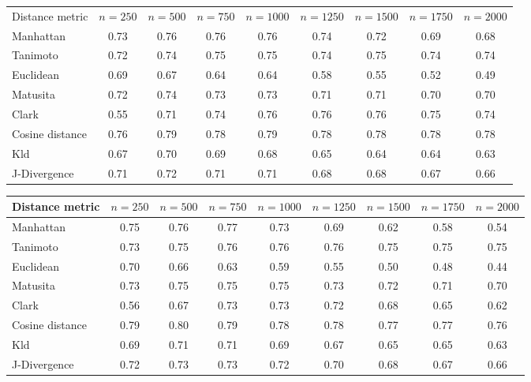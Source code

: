 \begin{table*}
  \centering
  \caption{Average precisions for $n$-MF Tokens and Lemmas on St-Jean}
  \label{tab:tokens_lemmas}

  \label{tab:tokens}
  \begin{tabular}{l c c c c c c c c}
    \toprule
    Distance metric &
    $n=250$ &
    $n=500$ &
    $n=750$ &
    $n=1000$ &
    $n=1250$ &
    $n=1500$ &
    $n=1750$ &
    $n=2000$ \\
    Manhattan       & 0.73 & 0.76 & 0.76 & 0.76 & 0.74 & 0.72 & 0.69 & 0.68 \\
    Tanimoto        & 0.72 & 0.74 & 0.75 & 0.75 & 0.74 & 0.75 & 0.74 & 0.74 \\
    Euclidean       & 0.69 & 0.67 & 0.64 & 0.64 & 0.58 & 0.55 & 0.52 & 0.49 \\
    Matusita        & 0.72 & 0.74 & 0.73 & 0.73 & 0.71 & 0.71 & 0.70 & 0.70 \\
    Clark           & 0.55 & 0.71 & 0.74 & 0.76 & 0.76 & 0.76 & 0.75 & 0.74 \\
    Cosine distance & 0.76 & 0.79 & 0.78 & 0.79 & 0.78 & 0.78 & 0.78 & 0.78 \\
    Kld             & 0.67 & 0.70 & 0.69 & 0.68 & 0.65 & 0.64 & 0.64 & 0.63 \\
    J-Divergence    & 0.71 & 0.72 & 0.71 & 0.71 & 0.68 & 0.68 & 0.67 & 0.66 \\
    \bottomrule
  \end{tabular}

  \vspace{0.5cm}

  \label{tab:lemmas}
  \begin{tabular}{l c c c c c c c c}
    \toprule
    Distance metric &
    $n=250$ &
    $n=500$ &
    $n=750$ &
    $n=1000$ &
    $n=1250$ &
    $n=1500$ &
    $n=1750$ &
    $n=2000$ \\
    \midrule
    Manhattan       & 0.75 & 0.76 & 0.77 & 0.73 & 0.69 & 0.62 & 0.58 & 0.54 \\
    Tanimoto        & 0.73 & 0.75 & 0.76 & 0.76 & 0.76 & 0.75 & 0.75 & 0.75 \\
    Euclidean       & 0.70 & 0.66 & 0.63 & 0.59 & 0.55 & 0.50 & 0.48 & 0.44 \\
    Matusita        & 0.73 & 0.75 & 0.75 & 0.75 & 0.73 & 0.72 & 0.71 & 0.70 \\
    Clark           & 0.56 & 0.67 & 0.73 & 0.73 & 0.72 & 0.68 & 0.65 & 0.62 \\
    Cosine distance & 0.79 & 0.80 & 0.79 & 0.78 & 0.78 & 0.77 & 0.77 & 0.76 \\
    Kld             & 0.69 & 0.71 & 0.71 & 0.69 & 0.67 & 0.65 & 0.65 & 0.63 \\
    J-Divergence    & 0.72 & 0.73 & 0.73 & 0.72 & 0.70 & 0.68 & 0.67 & 0.66 \\
    \bottomrule
  \end{tabular}
\end{table*}


